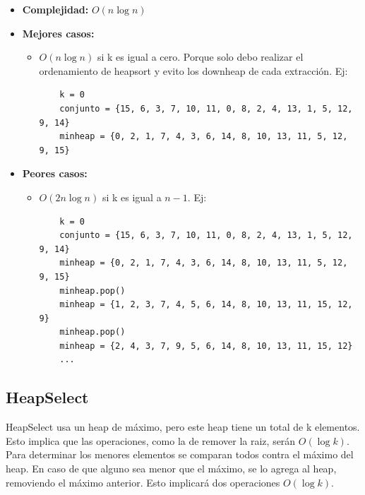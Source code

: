 \documentclass[a4paper,10pt]{article}
\begin{document}
\begin{itemize}

\item \textbf{Complejidad:} $O(n \log{n})$
\item \textbf{Mejores casos:}
	\begin{itemize}
	\item $O(n \log{n})$ si k es igual a cero. Porque solo debo realizar el ordenamiento de heapsort y evito los downheap de cada extracción. Ej:
	\begin{verbatim}
	k = 0
	conjunto = {15, 6, 3, 7, 10, 11, 0, 8, 2, 4, 13, 1, 5, 12, 9, 14}
	minheap = {0, 2, 1, 7, 4, 3, 6, 14, 8, 10, 13, 11, 5, 12, 9, 15}
	\end{verbatim}
	
	\end{itemize}
\item \textbf{Peores casos:}
	\begin{itemize}
	\item $O(2n \log{n})$ si k es igual a $n-1$. Ej:
	\begin{verbatim}
	k = 0
	conjunto = {15, 6, 3, 7, 10, 11, 0, 8, 2, 4, 13, 1, 5, 12, 9, 14}
	minheap = {0, 2, 1, 7, 4, 3, 6, 14, 8, 10, 13, 11, 5, 12, 9, 15}
	minheap.pop()
	minheap = {1, 2, 3, 7, 4, 5, 6, 14, 8, 10, 13, 11, 15, 12, 9}
	minheap.pop()
	minheap = {2, 4, 3, 7, 9, 5, 6, 14, 8, 10, 13, 11, 15, 12}
	...
	\end{verbatim}
	\end{itemize}
\end{itemize}

\subsection{HeapSelect}

HeapSelect usa un heap de máximo, pero este heap tiene un total de k elementos. Esto implica que las operaciones, como la de remover la raiz, serán $O(\log{k})$. Para determinar los menores elementos se comparan todos contra el máximo del heap. En caso de que alguno sea menor que el máximo, se lo agrega al heap, removiendo el máximo anterior. Esto implicará dos operaciones $O(\log{k})$.
\end{document}
